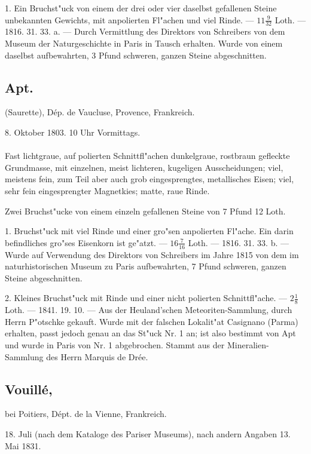 \documentclass[a4paper, 11pt, oneside, polutonikogreek, german]{article}
\begin{document}
1. Ein Bruchst"uck von einem der drei oder vier daselbst gefallenen Steine unbekannten Gewichts, mit anpolierten Fl"achen und viel Rinde. --- $11\frac{9}{32}$ Loth. --- 1816. 31. 33. a. --- Durch Vermittlung des Direktors von Schreibers von dem Museum der Naturgeschichte in Paris in Tausch erhalten. Wurde von einem daselbst aufbewahrten, 3 Pfund schweren, ganzen Steine abgeschnitten.
\subsection{Apt.}
\begin{center}
\small
(Saurette), Dép. de Vaucluse, Provence, Frankreich.

8. Oktober 1803. 10 Uhr Vormittags.
\end{center}
\paragraph{}
Fast lichtgraue, auf polierten Schnittfl"achen dunkelgraue, rostbraun gefleckte Grundmasse, mit einzelnen, meist lichteren, kugeligen Ausscheidungen; viel, meistens fein, zum Teil aber auch grob eingesprengtes, metallisches Eisen; viel, sehr fein eingesprengter Magnetkies; matte, raue Rinde.

Zwei Bruchst"ucke von einem einzeln gefallenen Steine von 7 Pfund 12 Loth.

1. Bruchst"uck mit viel Rinde und einer gro"sen anpolierten Fl"ache. Ein darin befindliches gro"ses Eisenkorn ist ge"atzt. --- $16\frac{7}{16}$ Loth. --- 1816. 31. 33. b. --- Wurde auf Verwendung des Direktors von Schreibers im Jahre 1815 von dem im naturhistorischen Museum zu Paris aufbewahrten, 7 Pfund schweren, ganzen Steine abgeschnitten.

2. Kleines Bruchst"uck mit Rinde und einer nicht polierten Schnittfl"ache. --- $2\frac{1}{8}$ Loth. --- 1841. 19. 10. --- Aus der Heuland'schen Meteoriten-Sammlung, durch Herrn P"otschke gekauft. Wurde mit der falschen Lokalit"at Casignano (Parma) erhalten, passt jedoch genau an das St"uck Nr. 1 an; ist also bestimmt von Apt und wurde in Paris von Nr. 1 abgebrochen. Stammt aus der Mineralien-Sammlung des Herrn Marquis de Drée.
\subsection[Vouillé.]{Vouillé,}
\begin{center}
\small
bei Poitiers, Dépt. de la Vienne, Frankreich.

18. Juli (nach dem Kataloge des Pariser Museums), nach andern Angaben 13. Mai 1831.
\end{center}
\end{document}
